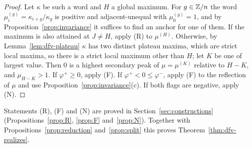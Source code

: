 \begin{proof}
Let $\kappa$ be such a word and $H$ a global maximum. For $g\in\mathbb{Z}/n$ the word
$\mu^{(g)}_i=\kappa_{i+g}/\kappa_g$ is positive and adjacent-unequal with
$\mu^{(g)}_0=1$, and by Proposition~\ref{prop:invariance} it suffices to find
an anchor for one of them. If the maximum is also attained at $J\ne H$, apply
(R) to $\mu^{(H)}$. Otherwise, by Lemma~\ref{lem:dfv-plateau} $\kappa$ has two
distinct plateau maxima, which are strict local maxima, so there is a
strict local maximum other than $H$; let $K$ be one of largest value. Then
$0$ is a highest secondary peak of $\mu=\mu^{(K)}$ relative to $H-K$, and
$\mu_{H-K}>1$. If $\varphi^+\ge0$, apply (F). If $\varphi^+<0\le\varphi^-$,
apply (F) to the reflection of $\mu$ and use
Proposition~\ref{prop:invariance}(c). If both flags are negative, apply (N).
\end{proof}

Statements (R), (F) and (N) are proved in Section~\ref{sec:constructions}
(Propositions~\ref{prop:R}, \ref{prop:F} and~\ref{prop:N}). Together with
Propositions~\ref{prop:reduction} and~\ref{prop:split} this proves
Theorem~\ref{thm:dfv-realizes}.
